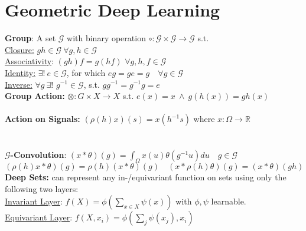 \color{black}

\section*{Geometric Deep Learning}
\textbf{Group}: A set $\mathcal{G}$ with binary operation $\circ: \mathcal{G} \times \mathcal{G} \rightarrow \mathcal{G}$ s.t. \\
\underline{Closure:} $gh \in \mathcal{G}\ \forall g,h \in \mathcal G$\\
\underline{Associativity}: $(gh)f = g(hf) \,\, \forall g,h,f \in \mathcal{G}$\\
\underline{Identity:} $\exists!\ e \in \mathcal{G}$, for which $eg = ge = g\quad  \forall g \in \mathcal G$\\
\underline{Inverse:} $\forall g\ \exists!$ $g^{-1} \in \mathcal G$, s.t. $gg^{-1} = g^{-1}g = e$\\
\textbf{Group Action:} \(\otimes: G \times X \to X\) s.t. \(e(x) = x \ \land \ g(h (x)) = gh( x)\)
\\
\\
\textbf{Action on Signals:} $(\rho(h) x)(s) = x(h^{-1} s)$ where $x: \Omega \to \mathbb{R}\quad$\\
\\
\\
\textbf{$\mathcal{G}$-Convolution}: $(x * \theta)(g) = \int_\Omega x(u) \theta(g^{-1}u) du \quad g \in \mathcal G$\\
$(\rho(h) x * \theta)(g) = \rho(h) (x * \theta)(g) \quad (x * \rho(h)\theta)(g) = (x * \theta)(gh)$
\\
\textbf{Deep Sets:} can represent any in-/equivariant function on sets using only the following two layers:\\
\underline{Invariant Layer}: $f(X) = \phi\left( \sum_{x \in X} \psi(x) \right)$ with $\phi, \psi$ learnable.\\
\underline{Equivariant Layer}: $f(X, x_i) = \phi\left( \sum_j \psi(x_j), x_i \right)$

